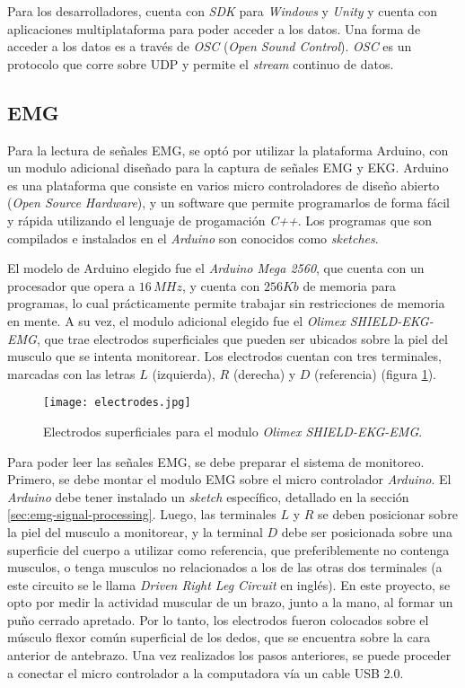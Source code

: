 Para los desarrolladores, cuenta con \emph{SDK} para \emph{Windows} y \emph{Unity} y cuenta con aplicaciones multiplataforma para poder acceder a los datos. Una forma de acceder a los datos es a través de \emph{OSC} (\emph{Open Sound Control}). \emph{OSC} es un protocolo que corre sobre UDP y permite el \emph{stream} continuo de datos.

\subsection{EMG} \label{emg-hardware}

Para la lectura de señales EMG, se optó por utilizar la plataforma Arduino, con un modulo adicional diseñado para la captura de señales EMG y EKG.  Arduino es una plataforma que consiste en varios micro controladores de diseño abierto (\emph{Open Source Hardware}), y un software que permite programarlos de forma fácil y rápida utilizando el lenguaje de progamación \emph{C++}. Los programas que son compilados e instalados en el \emph{Arduino} son conocidos como \emph{sketches}.

El modelo de Arduino elegido fue el \emph{Arduino Mega 2560}, que cuenta con un procesador que opera a $16\, MHz$, y cuenta con $256 Kb$ de memoria para programas, lo cual prácticamente permite trabajar sin restricciones de memoria en mente. A su vez, el modulo adicional elegido fue el \emph{Olimex SHIELD-EKG-EMG}, que trae electrodos superficiales que pueden ser ubicados sobre la piel del musculo que se intenta monitorear.  Los electrodos cuentan con tres terminales, marcadas con las letras $L$ (izquierda), $R$ (derecha) y $D$ (referencia) (figura \ref{fig:emg-electrodes}).

\begin{figure}[H]
	\centering
    \texttt{[image: electrodes.jpg]}
    \caption{Electrodos superficiales para el modulo \emph{Olimex SHIELD-EKG-EMG}.}
	\label{fig:emg-electrodes}
\end{figure}

Para poder leer las señales EMG, se debe preparar el sistema de monitoreo.  Primero, se debe montar el modulo EMG sobre el micro controlador \emph{Arduino}.  El \emph{Arduino} debe tener instalado un \emph{sketch} específico, detallado en la sección \ref{sec:emg-signal-processing}. Luego, las terminales $L$ y $R$ se deben posicionar sobre la piel del musculo a monitorear, y la terminal $D$ debe ser posicionada sobre una superficie del cuerpo a utilizar como referencia, que preferiblemente no contenga musculos, o tenga musculos no relacionados a los de las otras dos terminales (a este circuito se le llama \emph{Driven Right Leg Circuit} en inglés). En este proyecto, se opto por medir la actividad muscular de un brazo, junto a la mano, al formar un puño cerrado apretado. Por lo tanto, los electrodos fueron colocados sobre el músculo flexor común superficial de los dedos, que se encuentra sobre la cara anterior de antebrazo\cite{emg-signals-wrist}. Una vez realizados los pasos anteriores, se puede proceder a conectar el micro controlador a la computadora vía un cable USB 2.0.

